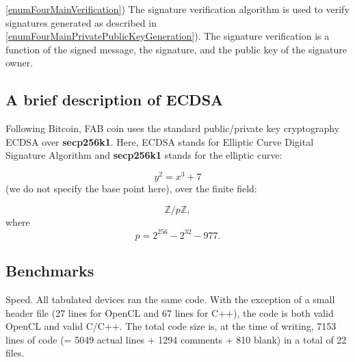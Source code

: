 \documentclass{article}
\newcommand{\secpTwoFiveSixKone}{{\bf secp256k1}}
\begin{document}
\noindent\ref{enumFourMainVerification}) The signature verification algorithm is used to verify signatures generated as described in \ref{enumFourMainPrivatePublicKeyGeneration}). The signature verification is a function of the signed message, the signature, and the public key of the signature owner.
\subsection{A brief description of ECDSA}\label{sectionECDSAgeneral}
Following Bitcoin, FAB coin uses the standard public/private key cryptography ECDSA over \secpTwoFiveSixKone. Here, ECDSA stands for Elliptic Curve Digital Signature Algorithm and \secpTwoFiveSixKone{} stands for the elliptic curve:

\[
y^2 = x^3 + 7
\]
(we do not specify the base point here), over the finite field:

\[
\mathbb Z / p\mathbb Z, 
\]
where
\begin{equation}\label{eqThePrime}
p= 2^{256} - 2^{32} - 977.
\end{equation}

\subsection{Benchmarks}

Speed. All tabulated devices ran the same code. With the exception of a small header file (27 lines for OpenCL and 67 lines for C++), the code is both valid OpenCL and valid C/C++. The total code size is, at the time of writing, 7153 lines of code (= 5049 actual lines + 1294 comments + 810 blank) in a total of 22 files.
\end{document}

